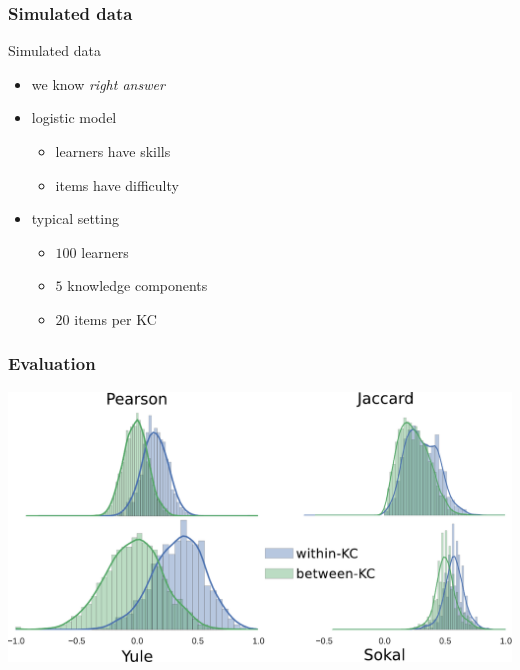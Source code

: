 \documentclass[xcolor=svgnames]{beamer}
\begin{document}
\begin{frame}
    \frametitle{Simulated data}
    \Large
    Simulated data
    \begin{itemize}
        \item we know \emph{right answer}
        \item logistic model
        \begin{itemize}
            \large
            \item learners have skills
            \item items have difficulty
        \end{itemize}
        \item typical setting
        \begin{itemize}
            \large
            \item $100$ learners
            \item $5$ knowledge components
            \item $20$ items per KC
        \end{itemize}
    \end{itemize}
\end{frame}
\begin{frame}
    \frametitle{Evaluation}
    \includegraphics[width=\linewidth]{figures/measure-histograms}
\end{frame}
\end{document}
